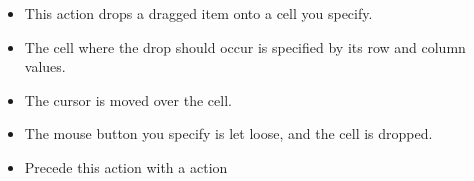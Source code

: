 
\begin{itemize}
\item This action drops a dragged item onto a cell you specify.
\item The cell where the drop should occur is specified by its row and column values.
\item The cursor is moved over the cell.
\item The mouse button you specify is let loose, and the cell is dropped. 
\item Precede this action with a  action
\end{itemize}

